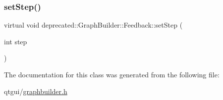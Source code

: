 \subsubsection{\texorpdfstring{setStep()}{setStep()}}
{\footnotesize\ttfamily virtual void deprecated\+::\+Graph\+Builder\+::\+Feedback\+::set\+Step (\begin{DoxyParamCaption}\item[{int}]{step }\end{DoxyParamCaption})\hspace{0.3cm}{\ttfamily [pure virtual]}}



The documentation for this class was generated from the following file\+:\begin{DoxyCompactItemize}
\item 
qtgui/\mbox{\hyperlink{graphbuilder_8h}{graphbuilder.\+h}}\end{DoxyCompactItemize}
